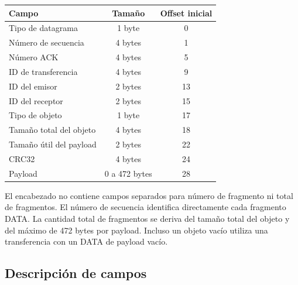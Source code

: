\documentclass[12pt]{article}
\begin{document}
\begin{table}[h]
\centering
\begin{tabular}{|l|c|c|}
\hline
Campo & Tamaño & Offset inicial \\
\hline
Tipo de datagrama & 1 byte & 0 \\
\hline
Número de secuencia & 4 bytes & 1 \\
\hline
Número ACK & 4 bytes & 5 \\
\hline
ID de transferencia & 4 bytes & 9 \\
\hline
ID del emisor & 2 bytes & 13 \\
\hline
ID del receptor & 2 bytes & 15 \\
\hline
Tipo de objeto & 1 byte & 17 \\
\hline
Tamaño total del objeto & 4 bytes & 18 \\
\hline
Tamaño útil del payload & 2 bytes & 22 \\
\hline
CRC32 & 4 bytes & 24 \\
\hline
Payload & 0 a 472 bytes & 28 \\
\hline
\end{tabular}
\end{table}

El encabezado no contiene campos separados para número de fragmento ni total de
fragmentos. El número de secuencia identifica directamente cada fragmento DATA.
La cantidad total de fragmentos se deriva del tamaño total del objeto y del
máximo de 472 bytes por payload. Incluso un objeto vacío utiliza una
transferencia con un DATA de payload vacío.

\subsection{Descripción de campos}
\end{document}
